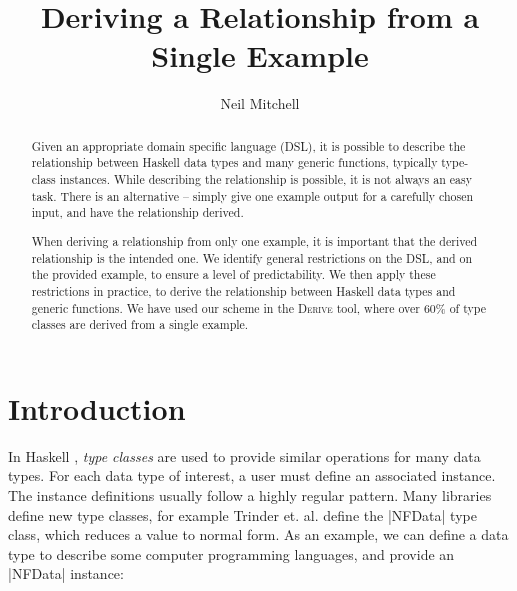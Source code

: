 \documentclass{llncs}
\newcommand{\derive}{\textsc{Derive}}
\newcommand\citet\cite
\begin{document}
\title{Deriving a Relationship from a Single Example}
\author{Neil Mitchell}

\maketitle


\begin{abstract}
Given an appropriate domain specific language (DSL), it is possible to describe the relationship between Haskell data types and many generic functions, typically type-class instances. While describing the relationship is possible, it is not always an easy task. There is an alternative -- simply give one example output for a carefully chosen input, and have the relationship derived.

When deriving a relationship from only one example, it is important that the derived relationship is the intended one. We identify general restrictions on the DSL, and on the provided example, to ensure a level of predictability. We then apply these restrictions in practice, to derive the relationship between Haskell data types and generic functions. We have used our scheme in the \derive{} tool, where over 60\% of type classes are derived from a single example.
\end{abstract}

\begin{comment}
\category{D.3}{Software}{Programming Languages}

\terms
Languages

\keywords
Haskell, Domain Specific Languages
\end{comment}

\section{Introduction}
\label{sec:introduction}

In Haskell \cite{haskell}, \textit{type classes} \cite{wadler:type_classes} are used to provide similar operations for many data types. For each data type of interest, a user must define an associated instance. The instance definitions usually follow a highly regular pattern. Many libraries define new type classes, for example Trinder et. al. \citet{trinder:strategies} define the |NFData| type class, which reduces a value to normal form. As an example, we can define a data type to describe some computer programming languages, and provide an |NFData| instance:
\end{document}
